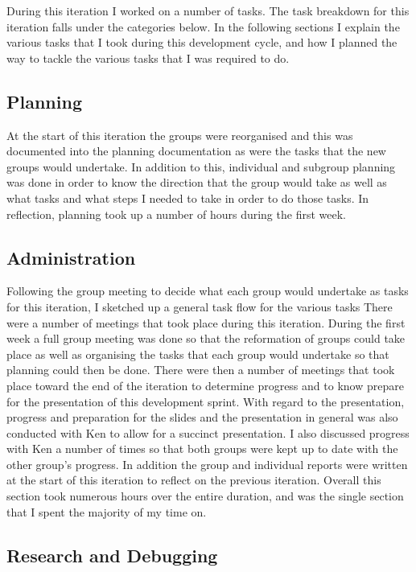 \documentclass{article}
\begin{document}
During this iteration I worked on a number of tasks. The task breakdown for this iteration falls under the categories below. In the following sections I explain the various tasks that I took during this development cycle, and how I planned the way to tackle the various tasks that I was required to do.

\subsection{Planning}

At the start of this iteration the groups were reorganised and this was documented into the planning documentation as were the tasks that the new groups would undertake. In addition to this, individual and subgroup planning was done in order to know the direction that the group would take as well as what tasks and what steps I needed to take in order to do those tasks. In reflection, planning took up a number of hours during the first week.\\

\subsection{Administration}

Following the group meeting to decide what each group would undertake as tasks for this iteration, I sketched up a general task flow for the various tasks There were a number of meetings that took place during this iteration. During the first week a full group meeting was done so that the reformation of groups could take place as well as organising the tasks that each group would undertake so that planning could then be done. There were then a number of meetings that took place toward the end of the iteration to determine progress and to know prepare for the presentation of this development sprint. With regard to the presentation, progress and preparation for the slides and the presentation in general was also conducted with Ken to allow for a succinct presentation. I also discussed progress with Ken a number of times so that both groups were kept up to date with the other group’s progress. In addition the group and individual reports were written at the start of this iteration to reflect on the previous iteration. Overall this section took numerous hours over the entire duration, and was the single section that I spent the majority of my time on.\\

\subsection{Research and Debugging}
\end{document}

